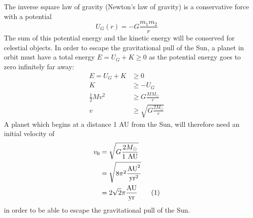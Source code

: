 \documentclass[reprint, english,notitlepage,nofootinbib]{revtex4-1}  %
\newcommand\numberthis{\addtocounter{equation}{1}\tag{\theequation}}
\begin{document}
The inverse square law of gravity (Newton's law of gravity) is a conservative force with a potential
\begin{equation}
  \label{eq:pot_G}
  U_G(r) = - G \frac{m_1 m_2}{r}
\end{equation}
The sum of this potential energy and the kinetic energy will be conserved for celestial objects. In order to escape the gravitational pull of the Sun, a planet in orbit must have a total energy $E = U_G + K \ge 0$ as the potential energy goes to zero infinitely far away:
\begin{align*}
  E = U_G + K &\ge 0 \\
  K &\ge - U_G \\
  \frac{1}{2} M v^2 &\ge G \frac{M M_\odot}{r} \\
  v &\ge \sqrt{G \frac{2 M_\odot}{r}}
\end{align*}
A planet which begins at a distance 1 AU from the Sun, will therefore need an initial velocity of
\begin{align*}
  v_0 &= \sqrt{G \frac{2 M_\odot}{1 \text{ AU}}} \\
  &= \sqrt{8 \pi^2 \frac{\text{AU}^2}{\text{yr}^2}} \\
  &= 2 \sqrt 2 \pi \frac{\text{AU}}{\text{yr}} \numberthis \label{eq:escape_velocity}
\end{align*}
in order to be able to escape the gravitational pull of the Sun.
\end{document}
